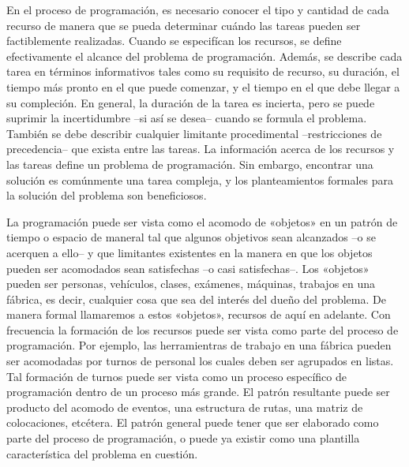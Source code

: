 \documentclass[draft,12pt,headsepline,footsepline,paper=letter]{scrreprt}
\begin{document}
En el proceso de programación, es necesario conocer el tipo y cantidad de cada recurso de manera que se pueda determinar cuándo las tareas pueden ser factiblemente realizadas. Cuando se especifícan los recursos, se define efectivamente el alcance del problema de programación. Además, se describe cada tarea en términos informativos tales como su requisito de recurso, su duración, el tiempo más pronto en el que puede comenzar, y el tiempo en el que debe llegar a su compleción. En general, la duración de la tarea es incierta, pero se puede suprimir la incertidumbre –si así se desea– cuando se formula el problema. También se debe describir cualquier limitante procedimental –restricciones de precedencia– que exista entre las tareas. La información acerca de los recursos y las tareas define un problema de programación. Sin embargo, encontrar una solución es comúnmente una tarea compleja, y los planteamientos formales para la solución del problema son beneficiosos\citep[p.~2]{Baker2009}.

La programación puede ser vista como el acomodo de «objetos» en un patrón de tiempo o espacio de maneral tal que algunos objetivos sean alcanzados –o se acerquen a ello– y que limitantes existentes en la manera en que los objetos pueden ser acomodados sean satisfechas –o casi satisfechas–. Los «objetos» pueden ser personas, vehículos, clases, exámenes, máquinas, trabajos en una fábrica, es decir, cualquier cosa que sea del interés del dueño del problema. De manera formal llamaremos a estos «objetos», recursos de aquí en adelante. Con frecuencia la formación de los recursos puede ser vista como parte del proceso de programación. Por ejemplo, las herramientras de trabajo en una fábrica pueden ser acomodadas por turnos de personal los cuales deben ser agrupados en listas. Tal formación de turnos puede ser vista como un proceso específico de programación dentro de un proceso más grande. El patrón resultante puede ser producto del acomodo de eventos, una estructura de rutas, una matriz de colocaciones, etcétera. El patrón general puede tener que ser elaborado como parte del proceso de programación, o puede ya existir como una plantilla característica del problema en cuestión\citep[p.~48]{wren95scheduling-timetabling}.
\end{document}
